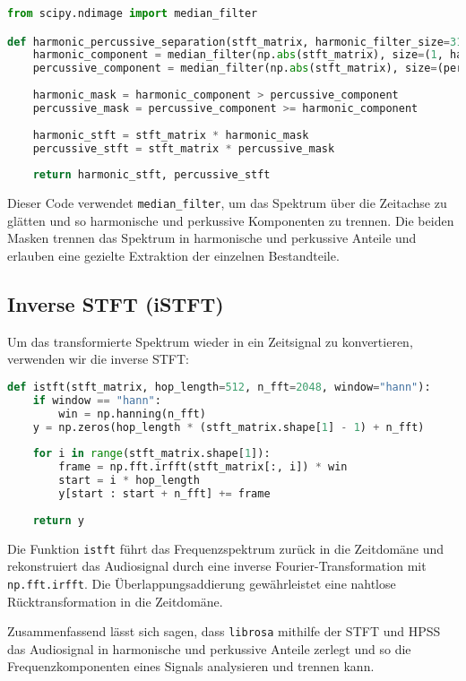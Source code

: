 \begin{lstlisting}[language=Python, caption={HPSS-Implementierung}]
from scipy.ndimage import median_filter

def harmonic_percussive_separation(stft_matrix, harmonic_filter_size=31, percussive_filter_size=31):
    harmonic_component = median_filter(np.abs(stft_matrix), size=(1, harmonic_filter_size))
    percussive_component = median_filter(np.abs(stft_matrix), size=(percussive_filter_size, 1))
    
    harmonic_mask = harmonic_component > percussive_component
    percussive_mask = percussive_component >= harmonic_component
    
    harmonic_stft = stft_matrix * harmonic_mask
    percussive_stft = stft_matrix * percussive_mask
    
    return harmonic_stft, percussive_stft
\end{lstlisting}

Dieser Code verwendet \texttt{median\_filter}, um das Spektrum über die Zeitachse zu glätten und so harmonische und perkussive Komponenten zu trennen. Die beiden Masken trennen das Spektrum in harmonische und perkussive Anteile und erlauben eine gezielte Extraktion der einzelnen Bestandteile.

\subsection{Inverse STFT (iSTFT)}

Um das transformierte Spektrum wieder in ein Zeitsignal zu konvertieren, verwenden wir die inverse STFT:

\begin{lstlisting}[language=Python, caption={iSTFT-Implementierung}]
def istft(stft_matrix, hop_length=512, n_fft=2048, window="hann"):
    if window == "hann":
        win = np.hanning(n_fft)
    y = np.zeros(hop_length * (stft_matrix.shape[1] - 1) + n_fft)
    
    for i in range(stft_matrix.shape[1]):
        frame = np.fft.irfft(stft_matrix[:, i]) * win
        start = i * hop_length
        y[start : start + n_fft] += frame
    
    return y
\end{lstlisting}

Die Funktion \texttt{istft} führt das Frequenzspektrum zurück in die Zeitdomäne und rekonstruiert das Audiosignal durch eine inverse Fourier-Transformation mit \texttt{np.fft.irfft}. Die Überlappungsaddierung gewährleistet eine nahtlose Rücktransformation in die Zeitdomäne.

Zusammenfassend lässt sich sagen, dass \texttt{librosa} mithilfe der STFT und HPSS das Audiosignal in harmonische und perkussive Anteile zerlegt und so die Frequenzkomponenten eines Signals analysieren und trennen kann.
